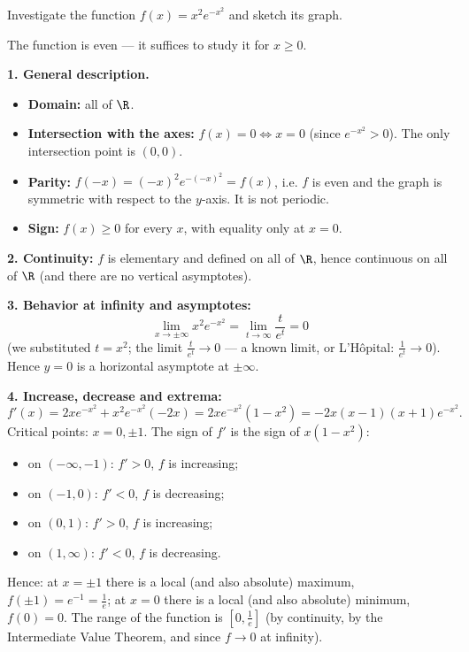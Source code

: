 
\begin{question}
Investigate the function $f(x)=x^2e^{-x^2}$ and sketch its graph.
\end{question}

\begin{hint}
The function is even — it suffices to study it for $x\ge0$.
\end{hint}

\begin{solution}
\textbf{1. General description.}
\begin{itemize}
  \item \textbf{Domain:} all of $\R$.
  \item \textbf{Intersection with the axes:} $f(x)=0\iff x=0$ (since $e^{-x^2}>0$). The only intersection point is $(0,0)$.
  \item \textbf{Parity:} $f(-x)=(-x)^2e^{-(-x)^2}=f(x)$, i.e. $f$ is even and the graph is symmetric with respect to the $y$-axis. It is not periodic.
  \item \textbf{Sign:} $f(x)\ge0$ for every $x$, with equality only at $x=0$.
\end{itemize}

\textbf{2. Continuity:} $f$ is elementary and defined on all of $\R$, hence continuous on all of $\R$ (and there are no vertical asymptotes).

\textbf{3. Behavior at infinity and asymptotes:}
\[ \lim_{x\to\pm\infty}x^2e^{-x^2}=\lim_{t\to\infty}\frac{t}{e^t}=0 \]
(we substituted $t=x^2$; the limit $\frac{t}{e^t}\to0$ — a known limit, or L'Hôpital: $\frac{1}{e^t}\to0$). Hence $y=0$ is a horizontal asymptote at $\pm\infty$.

\textbf{4. Increase, decrease and extrema:}
\[ f'(x)=2xe^{-x^2}+x^2e^{-x^2}(-2x)=2xe^{-x^2}(1-x^2)=-2x(x-1)(x+1)e^{-x^2}. \]
Critical points: $x=0,\pm1$. The sign of $f'$ is the sign of $x(1-x^2)$:
\begin{itemize}
  \item on $(-\infty,-1)$: $f'>0$, $f$ is increasing;
  \item on $(-1,0)$: $f'<0$, $f$ is decreasing;
  \item on $(0,1)$: $f'>0$, $f$ is increasing;
  \item on $(1,\infty)$: $f'<0$, $f$ is decreasing.
\end{itemize}
Hence: at $x=\pm1$ there is a local (and also absolute) maximum, $f(\pm1)=e^{-1}=\frac1e$; at $x=0$ there is a local (and also absolute) minimum, $f(0)=0$. The range of the function is $\left[0,\frac1e\right]$ (by continuity, by the Intermediate Value Theorem, and since $f\to0$ at infinity).


\end{solution}
